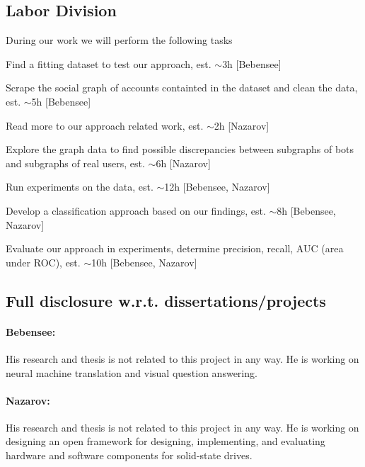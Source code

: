 \subsection{Labor Division}

During our work we will perform the following tasks
\bit
\item Find a fitting dataset to test our approach, est. $\sim$3h [Bebensee]
\item Scrape the social graph of accounts containted in the dataset and clean the data, est. $\sim$5h [Bebensee]
\item Read more to our approach related work, est. $\sim$2h [Nazarov]
\item Explore the graph data to find possible discrepancies between subgraphs of bots and subgraphs of real users, est. $\sim$6h [Nazarov]
\item Run experiments on the data, est. $\sim$12h [Bebensee, Nazarov]
\item Develop a classification approach based on our findings, est. $\sim$8h [Bebensee, Nazarov]
\item Evaluate our approach in experiments, determine precision, recall, AUC (area under ROC), est. $\sim$10h [Bebensee, Nazarov]
\eit

\subsection{Full disclosure w.r.t. dissertations/projects}

\paragraph{Bebensee:}
His research and thesis is not related to this project in any way. He is working on neural machine translation and visual question answering.

\paragraph{Nazarov:}
His research and thesis is not related to this project in any way. He is working on designing an open framework for designing, implementing, and evaluating hardware and software components for solid-state drives. 